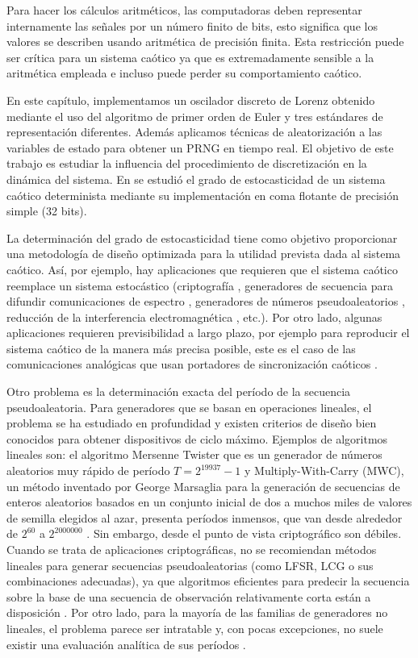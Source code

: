 Para hacer los cálculos aritméticos, las computadoras deben representar internamente las señales por un número finito de bits, esto significa que los valores se describen usando aritmética de precisión finita.
Esta restricción puede ser crítica para un sistema caótico ya que es extremadamente sensible a la aritmética empleada e incluso puede perder su comportamiento caótico.

En este capítulo, implementamos un oscilador discreto de Lorenz obtenido mediante el uso del algoritmo de primer orden de Euler y tres estándares de representación diferentes.
Además aplicamos técnicas de aleatorización a las variables de estado para obtener un PRNG en tiempo real.
El objetivo de este trabajo es estudiar la influencia del procedimiento de discretización en la dinámica del sistema.
En \cite{DeMicco2010} se estudió el grado de estocasticidad de un sistema caótico determinista mediante su implementación en coma flotante de precisión simple (32 bits).

La determinación del grado de estocasticidad tiene como objetivo proporcionar una metodología de diseño optimizada para la utilidad prevista dada al sistema caótico.
Así, por ejemplo, hay aplicaciones que requieren que el sistema caótico reemplace un sistema estocástico (criptografía \cite{Fernandez2003}, generadores de secuencia para difundir comunicaciones de espectro \cite{Setti2004, DeMicco2007B}, generadores de números pseudoaleatorios \cite{Kocarev2003, Larrondo2006, DeMicco2009}, reducción de la interferencia electromagnética \cite{Callegari2003A}, etc.).
Por otro lado, algunas aplicaciones requieren previsibilidad a largo plazo, por ejemplo para reproducir el sistema caótico de la manera más precisa posible, este es el caso de las comunicaciones analógicas que usan portadores de sincronización caóticos \cite{Kocarev1995, Hidalgo2001}.

Otro problema es la determinación exacta del período de la secuencia pseudoaleatoria.
Para generadores que se basan en operaciones lineales, el problema se ha estudiado en profundidad y existen criterios de diseño bien conocidos para obtener dispositivos de ciclo máximo.
Ejemplos de algoritmos lineales son: el algoritmo Mersenne Twister que es un generador de números aleatorios muy rápido de período $T = 2^{19937} - 1$ \cite{Matsumoto1998} y Multiply-With-Carry (MWC), un método inventado por George Marsaglia para la generación de secuencias de enteros aleatorios basados en un conjunto inicial de dos a muchos miles de valores de semilla elegidos al azar, presenta períodos inmensos, que van desde alrededor de $2 ^ {60}$ a $2 ^ {2000000}$ \cite{Marsaglia1991}.
Sin embargo, desde el punto de vista criptográfico son débiles.
Cuando se trata de aplicaciones criptográficas, no se recomiendan métodos lineales para generar secuencias pseudoaleatorias (como LFSR, LCG o sus combinaciones adecuadas), ya que algoritmos eficientes para predecir la secuencia sobre la base de una secuencia de observación relativamente corta están a disposición \cite{Boyar1989, Plumstead1982}.
Por otro lado, para la mayoría de las familias de generadores no lineales, el problema parece ser intratable y, con pocas excepciones, no suele existir una evaluación analítica de sus períodos \cite{kocarev2011}.

